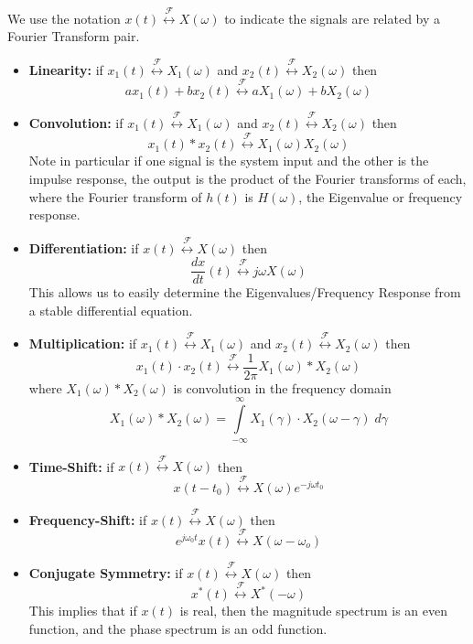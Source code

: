 We use the notation $x(t) \stackrel{\mathcal{F}}{\longleftrightarrow} X(\omega)$ to indicate the signals are related by a Fourier Transform pair.
\begin{itemize}
\item \textbf{Linearity:} if $x_1(t) \stackrel{\mathcal{F}}{\longleftrightarrow} X_1(\omega)$ and $x_2(t) \stackrel{\mathcal{F}}{\longleftrightarrow} X_2(\omega)$ then
  \[
  ax_1(t) + bx_2(t) \stackrel{\mathcal{F}}{\longleftrightarrow} aX_1(\omega) + bX_2(\omega)
  \]
\item \textbf{Convolution:} if $x_1(t) \stackrel{\mathcal{F}}{\longleftrightarrow} X_1(\omega)$ and $x_2(t) \stackrel{\mathcal{F}}{\longleftrightarrow} X_2(\omega)$ then
  \[
  x_1(t) * x_2(t) \stackrel{\mathcal{F}}{\longleftrightarrow} X_1(\omega)X_2(\omega)
  \]
  Note in particular if one signal is the system input and the other is the impulse response, the output is the product of the Fourier transforms of each, where the Fourier transform of $h(t)$ is $H(\omega)$, the Eigenvalue or frequency response.
\item \textbf{Differentiation:} if $x(t) \stackrel{\mathcal{F}}{\longleftrightarrow} X(\omega)$ then
  \[
  \frac{dx}{dt}(t) \stackrel{\mathcal{F}}{\longleftrightarrow} j\omega X(\omega)
  \]
  This allows us to easily determine the Eigenvalues/Frequency Response from a stable differential equation.
\item \textbf{Multiplication:} if $x_1(t) \stackrel{\mathcal{F}}{\longleftrightarrow} X_1(\omega)$ and $x_2(t) \stackrel{\mathcal{F}}{\longleftrightarrow} X_2(\omega)$ then
  \[
  x_1(t) \cdot x_2(t) \stackrel{\mathcal{F}}{\longleftrightarrow} \frac{1}{2\pi} X_1(\omega)*X_2(\omega)
  \]
  where $X_1(\omega)*X_2(\omega)$ is convolution in the frequency domain
  \[
  X_1(\omega)*X_2(\omega) = \int\limits_{-\infty}^{\infty} X_1(\gamma)\cdot X_2(\omega-\gamma)\;d\gamma 
  \]
\item \textbf{Time-Shift:} if $x(t) \stackrel{\mathcal{F}}{\longleftrightarrow} X(\omega)$ then
  \[
  x(t-t_0) \stackrel{\mathcal{F}}{\longleftrightarrow} X(\omega)e^{-j\omega t_0}
  \]
\item \textbf{Frequency-Shift:} if $x(t) \stackrel{\mathcal{F}}{\longleftrightarrow} X(\omega)$ then
  \[
  e^{j\omega_0 t}x(t) \stackrel{\mathcal{F}}{\longleftrightarrow} X(\omega-\omega_o)
  \]
\item \textbf{Conjugate Symmetry:} if $x(t) \stackrel{\mathcal{F}}{\longleftrightarrow} X(\omega)$ then
  \[
  x^*(t) \stackrel{\mathcal{F}}{\longleftrightarrow} X^*(-\omega)
  \]
  This implies that if $x(t)$ is real, then the magnitude spectrum is an even function, and the phase spectrum is an odd function.


\end{itemize}
